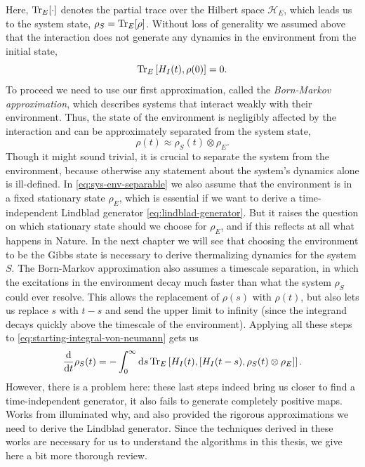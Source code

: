 Here, $\operatorname{Tr}_E[\cdot]$ denotes the partial trace over the Hilbert space $\mathcal{H}_E$, which leads us to the system state, $\rho_S = \operatorname{Tr}_E[\rho]$. Without loss of generality we assumed above that the interaction does not generate any dynamics in the environment from the initial state,
\begin{equation}
    \operatorname{Tr}_E\left[H_I(t), \rho(0)\right] = 0.
\end{equation}
To proceed we need to use our first approximation, called the \textit{Born-Markov approximation}, which describes systems that interact weakly with their environment. Thus, the state of the environment is negligibly affected by the interaction and can be approximately separated from the system state, 
\begin{equation}
    \label{eq:sys-env-separable}
    \rho(t) \approx \rho_S(t) \otimes \rho_E.
\end{equation}
Though it might sound trivial, it is crucial to separate the system from the environment, because otherwise any statement about the system's dynamics alone is ill-defined. In \eqref{eq:sys-env-separable} we also assume that the environment is in a fixed stationary state $\rho_E$, which is essential if we want to derive a time-independent Lindblad generator \eqref{eq:lindblad-generator}. But it raises the question on which stationary state should we choose for $\rho_E$, and if this reflects at all what happens in Nature. In the next chapter we will see that choosing the environment to be the Gibbs state is necessary to derive thermalizing dynamics for the system $S$.
The Born-Markov approximation also assumes a timescale separation, in which the excitations in the environment decay much faster than what the system $\rho_S$ could ever resolve. This allows the replacement of $\rho(s)$ with $\rho(t)$, but also lets us replace $s$ with $t-s$ and send the upper limit to infinity (since the integrand decays quickly above the timescale of the environment). Applying all these steps to \eqref{eq:starting-integral-von-neumann} gets us
\begin{equation}
    \label{eq:born-markov-me}
    \frac{\mathop{}\!\mathrm{d}}{\mathop{}\!\mathrm{d} t}\rho_S(t) = -\int_0^\infty \mathop{}\!\mathrm{d} s \operatorname{Tr}_E \left[H_I(t), \left[H_I(t-s), \rho_S(t)\otimes\rho_E\right]\right].
\end{equation}
However, there is a problem here: these last steps indeed bring us closer to find a time-independent generator, it also fails to generate completely positive maps. Works from \cite{davies1974markovian,dumcke1979proper} illuminated why, and also provided the rigorous approximations we need to derive the Lindblad generator. Since the techniques derived in these works are necessary for us to understand the algorithms in this thesis, we give here a bit more thorough review. 

